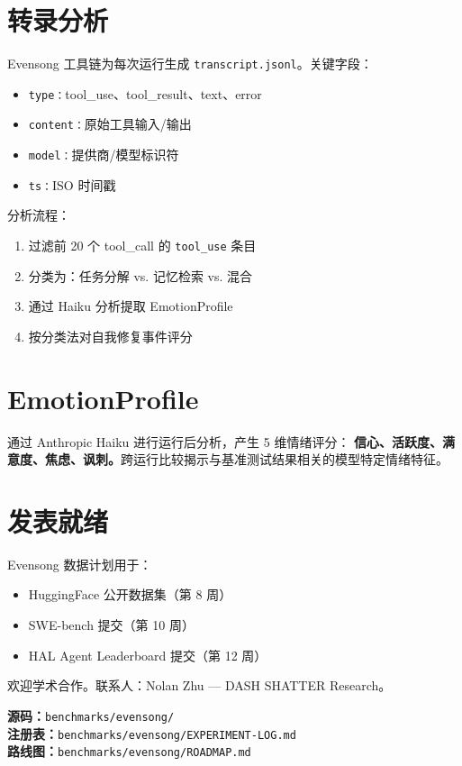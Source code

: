 \documentclass[11pt,a4paper]{article}
\begin{document}
\section{转录分析}

Evensong 工具链为每次运行生成 \texttt{transcript.jsonl}。关键字段：
\begin{itemize}
  \item \texttt{type：}tool\_use、tool\_result、text、error
  \item \texttt{content：}原始工具输入/输出
  \item \texttt{model：}提供商/模型标识符
  \item \texttt{ts：}ISO 时间戳
\end{itemize}

分析流程：
\begin{enumerate}
  \item 过滤前 20 个 tool\_call 的 \texttt{tool\_use} 条目
  \item 分类为：任务分解 vs. 记忆检索 vs. 混合
  \item 通过 Haiku 分析提取 EmotionProfile
  \item 按分类法对自我修复事件评分
\end{enumerate}

\section{EmotionProfile}

通过 Anthropic Haiku 进行运行后分析，产生 5 维情绪评分：
\textbf{信心、活跃度、满意度、焦虑、讽刺。}跨运行比较揭示与基准测试结果相关的模型特定情绪特征。

\section{发表就绪}

Evensong 数据计划用于：
\begin{itemize}
  \item HuggingFace 公开数据集（第 8 周）
  \item SWE-bench 提交（第 10 周）
  \item HAL Agent Leaderboard 提交（第 12 周）
\end{itemize}

欢迎学术合作。联系人：Nolan Zhu — DASH SHATTER Research。

\vfill
\textbf{源码：}\texttt{benchmarks/evensong/}\\
\textbf{注册表：}\texttt{benchmarks/evensong/EXPERIMENT-LOG.md}\\
\textbf{路线图：}\texttt{benchmarks/evensong/ROADMAP.md}
\end{document}
